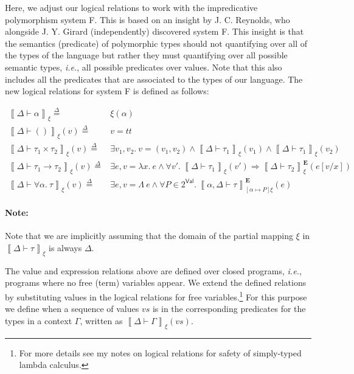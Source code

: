 \documentclass{article}
\newcommand{\ie}{\textit{i.e.}}
\newcommand{\TT}{\mathit{tt}}
\newcommand{\VAL}{\mathsf{Val}}
\newcommand{\UNT}{()}
\newcommand{\defeq}{\overset{\Delta}{=}}
\newcommand{\semtyp}[3]{\left\llbracket #2 \vdash #3 \right\rrbracket_{#1}}
\newcommand{\semErel}[1]{#1^{\textbf{E}}}
\newcommand{\semenv}{\xi}
\newcommand{\TLam}{\Lambda}
\newcommand{\Tctx}{\Gamma}
\newcommand{\CtxTps}{\Delta}
\newcommand{\expr}{e}
\newcommand{\val}{v}
\newcommand{\var}{x}
\newcommand{\typ}{\tau}
\newcommand{\tvar}{\alpha}
\begin{document}
Here, we adjust our logical relations to work with the impredicative polymorphism system F.
This is based on an insight by J. C. Reynolds, who alongside J. Y. Girard (independently) discovered system F.
This insight is that the semantics (predicate) of polymorphic types should not quantifying over all of the types of the language but rather
they must quantifying over all possible semantic types, \ie{}, all possible predicates over values.
Note that this also includes all the predicates that are associated to the types of our language.
The new logical relations for system F is defined as follows:

\begin{align*}
\semtyp{\semenv}{\CtxTps}{\tvar} \defeq{}& \semenv(\tvar)\\
\semtyp{\semenv}{\CtxTps}{\UNT}(\val) \defeq{}& v = \TT\\
\semtyp{\semenv}{\CtxTps}{\typ_1 \times \typ_2}(\val) \defeq{}& \exists \val_1, \val_2.~\val = (\val_1, \val_2) \land
\semtyp{\semenv}{\CtxTps}{\typ_1}(\val_1) \land \semtyp{\semenv}{\CtxTps}{\typ_1}(\val_2)\\
\semtyp{\semenv}{\CtxTps}{\typ_1 \to \typ_2}(\val) \defeq{}& \exists \expr, \val = \lambda \var.~\expr \land
\forall \val'.~\semtyp{\semenv}{\CtxTps}{\typ_1}(\val') \Rightarrow \semErel{\semtyp{\semenv}{\CtxTps}{\typ_2}}(\expr[\val/\var])\\
\semtyp{\semenv}{\CtxTps}{\forall \tvar.~\typ}(\val) \defeq{}& \exists \expr, \val = \TLam~\expr\land
\forall P \in 2^{\VAL}.~\semErel{\semtyp{[\tvar \mapsto P]\semenv}{\tvar, \CtxTps}{\typ}}(\expr)
\end{align*}

\paragraph{Note:} Note that we are implicitly assuming that the domain of the partial mapping $\semenv$ in $\semtyp{\semenv}{\CtxTps}{\typ}$ is always $\CtxTps$.

The value and expression relations above are defined over closed programs, \ie{}, programs where no free (term) variables appear.
We extend the defined relations by substituting values in the logical relations for free variables.\footnote{For more details see my notes on logical relations for safety of simply-typed lambda calculus.}
For this purpose we define when a sequence of values $\mathit{vs}$ is in the corresponding predicates for the types in a context $\Tctx$, written as $\semtyp{\semenv}{\CtxTps}{\Tctx}(\mathit{vs})$.
\end{document}
